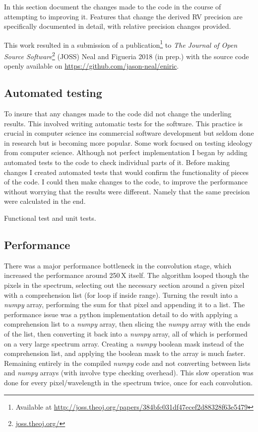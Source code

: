 In this section  document the changes made to the code in the course of attempting to improving it.
Features that change the derived {RV} precision are specifically documented in detail, with relative precision changes provided.

This work resulted in a submission of a publication\footnote{Available at \href{http://joss.theoj.org/papers/384bfc031df47ecef2d88328f63e5479}{http://joss.theoj.org/papers/384bfc031df47ecef2d88328f63e5479}} to \emph{The Journal of Open Source Software}\footnote{\href{http://joss.theoj.org/}{joss.theoj.org/}} (JOSS) {Neal and Figueria 2018 (in prep.)} with the source code openly available on \href{Github}{https://github.com/jason-neal/eniric}.


\subsection{Automated testing}
To insure that any changes made to the code did not change the underling results.
This involved writing automatic tests for the software.
This practice is crucial in computer science ins commercial software development but seldom done in research but is becoming more popular.
Some work focused on testing ideology from computer science.
Although not perfect implementation I began by adding automated tests to the code to check individual parts of it.
Before making changes I created automated tests that would confirm the functionality of pieces of the code.
I could then make changes to the code, to improve the performance without worrying that the results were different.
Namely that the same precision were calculated in the end.

Functional test and unit tests.


\subsection{Performance}
\label{subsec:code_performance}
There was a major performance bottleneck in the convolution stage, which increased the performance around 250\,X itself.
The algorithm looped though the pixels in the spectrum, selecting out the necessary section around a given pixel with a comprehension list (for loop if inside range).
Turning the result into a \emph{numpy} array, performing the sum for that pixel and appending it to a list.
The performance issue was a python implementation detail to do with applying a comprehension list to a \emph{numpy} array, then slicing the \emph{numpy} array with the ends of the list, then converting it back into a \emph{numpy} array, all of which is performed on a very large spectrum array.
Creating a \emph{numpy} boolean mask instead of the comprehension list, and applying the boolean mask to the array is much faster.
Remaining entirely in the compiled \emph{numpy} code and not converting between lists and \emph{numpy} arrays (with involve type checking overhead).
This slow operation was done for every pixel/wavelength in the spectrum twice, once for each convolution.

